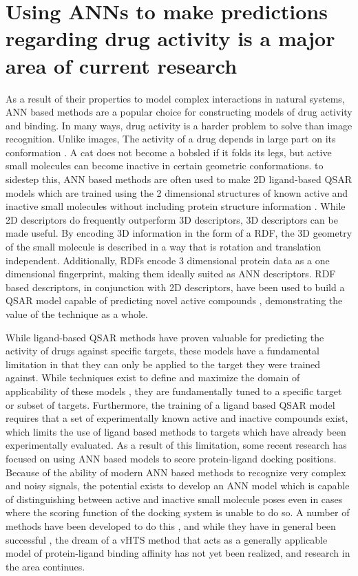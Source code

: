 \section{Using \acs{ANN}s to make predictions regarding drug activity is a major area of current research}

As a result of their properties to model complex interactions in natural systems, \ac{ANN} based methods are a popular choice for constructing models of drug activity and binding. 
In many ways, drug activity is a harder problem to solve than image recognition.
Unlike images, The activity of a drug depends in large part on its conformation \citep{Nicklaus:1995tu}.
A cat does not become a bobsled if it folds its legs, but active small molecules can become inactive in certain geometric conformations.
to sidestep this, \ac{ANN} based methods are often used to make 2D ligand-based \ac{QSAR} models which are trained using the 2 dimensional structures of known active and inactive small molecules without including protein structure information \citep{Myint:2012ts}.
While 2D descriptors do frequently outperform 3D descriptors, 3D descriptors can be made useful.
By encoding 3D information in the form of a \ac{RDF}, the 3D geometry of the small molecule is described in a way that is rotation and translation independent.
Additionally, \ac{RDF}s encode 3 dimensional protein data as a one dimensional fingerprint, making them ideally suited as \ac{ANN} descriptors.
\ac{RDF} based descriptors, in conjunction with 2D descriptors, have been used to build a \ac{QSAR} model capable of predicting novel active compounds \citep{Mueller:2010dx}, demonstrating the value of the technique as a whole.

While ligand-based \ac{QSAR} methods have proven valuable for predicting the activity of drugs against specific targets, these models have a fundamental limitation in that they can only be applied to the target they were trained against.
While techniques exist to define and maximize the domain of applicability of these models \citep{Sahigara:2012kb}, they are fundamentally tuned to a specific target or subset of targets. 
Furthermore, the training of a ligand based \ac{QSAR} model requires that a set of experimentally known active and inactive compounds exist, which limits the use of ligand based methods to targets which have already been experimentally evaluated.
As a result of this limitation, some recent research has focused on using \ac{ANN} based models to score protein-ligand docking positions.
Because of the ability of modern \ac{ANN} based methods to recognize very complex and noisy signals, the potential exists to develop an \ac{ANN} model which is capable of distinguishing between active and inactive small molecule poses even in cases where the scoring function of the docking system is unable to do so. 
A number of methods have been developed to do this \citep{Durrant:2013db}, and while they have in general been successful \citep{Durrant:2011dx}, the dream of a \ac{vHTS} method that acts as a generally applicable model of protein-ligand binding affinity has not yet been realized, and research in the area continues. 


